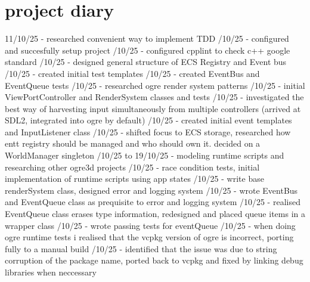 \documentclass[]{final_report}
\begin{document}
\section{project diary}
11/10/25 - researched convenient way to implement TDD /10/25 - configured and succesfully setup project /10/25 - configured cpplint to check c++ google standard /10/25 - designed general structure of ECS Registry and Event bus /10/25 - created initial test templates /10/25 - created EventBus and EventQueue tests /10/25 - researched ogre render system patterns /10/25 - initial ViewPortController and RenderSystem classes and tests /10/25 - investigated the best way of harvesting input simultaneously from multiple controllers (arrived at SDL2, integrated into ogre by default) /10/25 - created initial event templates and InputListener class /10/25 - shifted focus to ECS storage, researched how entt registry should be managed and who should own it. decided on a WorldManager singleton /10/25 to 19/10/25 - modeling runtime scripts and researching other ogre3d projects /10/25 - race condition tests, initial implementation of runtime scripts using app states /10/25 - write base renderSystem class, designed error and logging system  /10/25 - wrote EventBus and EventQueue class as prequisite to error and logging system /10/25 - realised EventQueue class erases type information, redesigned and placed queue items in a wrapper class /10/25 - wrote passing tests for eventQueue /10/25 - when doing ogre runtime tests i realised that the vcpkg version of ogre is incorrect, porting fully to a manual build /10/25 - identified that the issue was due to string corruption of the package name, ported back to vcpkg and fixed by linking debug libraries when neccessary \newline
\end{document}
